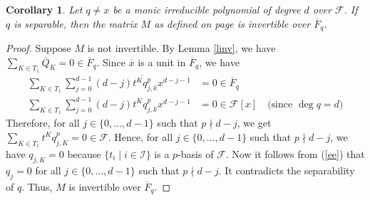 \documentclass[times,10pt]{amsart}
\newcommand{\F}{\ensuremath{\mathcal{F}}}
\newcommand{\I}{\ensuremath{\mathcal{I}}}
\newtheorem{cor}[thm]{Corollary}%
\begin{document}
\begin{cor}\label{corsep}
    Let $q\neq x$ be a monic irreducible  polynomial of degree $d$ over $\F$.    If $q$ is separable, then  the matrix $  M$ as defined on page \pageref{dm} is invertible over $\overline{F}_q$.
\end{cor}

\begin{proof}
    Suppose $M$ is not invertible.  By Lemma \ref{linv},  we have   $ \sum_{K\in T_1} {\overline{Q}_K}=0\in \overline{F}_q$.  Since $\overline{x}$ is a unit in $\overline{F}_q$, we have \begin{align*} \sum_{K\in T_1}  \sum_{j=0}^{d-1} \overline{ (d-j) t^K q^p_{j,k} x^{d-j-1}}&=0\in \overline{F}_q\\\sum_{K\in T_1}  \sum_{j=0}^{d-1} { (d-j) t^K q^p_{j,k} x^{d-j-1}}&=0 \in \F[x]\quad \text{(since $\deg q=d$)}\end{align*}{Therefore,  for all $j\in \{0,\ldots,d-1\}$ such that  $p\nmid d-j$, we get $\sum_{K\in T_1} t^K q^p_{j,K}=0\in \F$. Hence, for all $j\in \{0,\ldots,d-1\}$ such that  $p\nmid d-j$, we have $q_{j,K}=0$ because $\{t_i\mid i\in \I\}$ is a $p$-basis of $\F$.} Now it follows from  (\ref{ee}) that  $q_j=0$ for all $j\in \{0,\ldots,d-1\}$ such that $p\nmid d-j$. It contradicts the separability of $q$. Thus, $M$ is invertible over $\overline{F}_q$.\end{proof}
    
\end{document}
